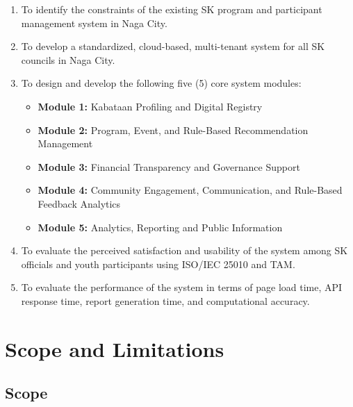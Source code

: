 \begin{enumerate}
    \item To identify the constraints of the existing SK program and participant management system in Naga City.
    \item To develop a standardized, cloud-based, multi-tenant system for all SK councils in Naga City.
    \item To design and develop the following five (5) core system modules:
    \begin{itemize}
        \item \textbf{Module 1:} Kabataan Profiling and Digital Registry
        \item \textbf{Module 2:} Program, Event, and Rule-Based Recommendation Management
        \item \textbf{Module 3:} Financial Transparency and Governance Support
        \item \textbf{Module 4:} Community Engagement, Communication, and Rule-Based Feedback Analytics
        \item \textbf{Module 5:} Analytics, Reporting and Public Information
    \end{itemize}
    \item To evaluate the perceived satisfaction and usability of the system among SK officials and youth participants using ISO/IEC 25010 and TAM.
    \item To evaluate the performance of the system in terms of page load time, API response time, report generation time, and computational accuracy.
\end{enumerate}
\vspace{5mm}

\section{Scope and Limitations}
\label{sec:scope_and_limitations}

\subsection{Scope}
\label{subsec:scope}

